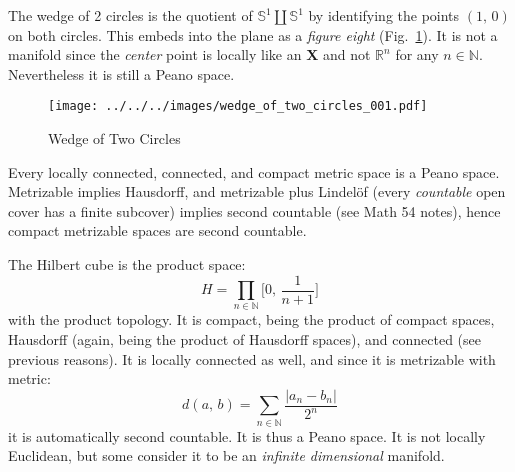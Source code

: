 \documentclass{article}
\theoremstyle{plain}
\theoremstyle{normal}
\newenvironment{example}{%
    \pushQED{\qed}\renewcommand{\qedsymbol}{$\blacksquare$}\examplex%
}{%
    \popQED\endexamplex%
}
\begin{document}
        \begin{example}
            The wedge of 2 circles is the quotient of
            $\mathbb{S}^{1}\coprod\mathbb{S}^{1}$ by identifying the points
            $(1,\,0)$ on both circles. This embeds into the plane as a
            \textit{figure eight} (Fig.~\ref{fig:wedge_of_two_circles_001}).
            It is not a manifold since the \textit{center} point is locally
            like an \textbf{X} and not $\mathbb{R}^{n}$ for any
            $n\in\mathbb{N}$. Nevertheless it is still a Peano space.
        \end{example}
        \begin{figure}
            \centering
            \texttt{[image: ../../../images/wedge\_of\_two\_circles\_001.pdf]}
            \caption{Wedge of Two Circles}
            \label{fig:wedge_of_two_circles_001}
        \end{figure}
        \begin{example}
            Every locally connected, connected, and compact metric space is a
            Peano space. Metrizable implies Hausdorff, and
            metrizable plus Lindel\"{o}f (every \textit{countable} open cover
            has a finite subcover) implies second countable (see Math 54 notes),
            hence compact metrizable spaces are second countable.
        \end{example}
        \begin{example}
            The Hilbert cube is the product space:
            \begin{equation}
                H=\prod_{n\in\mathbb{N}}\big[0,\,\frac{1}{n+1}\big]
            \end{equation}
            with the product topology. It is compact, being the product of
            compact spaces, Hausdorff (again, being the product of Hausdorff
            spaces), and connected (see previous reasons). It is locally
            connected as well, and since it is metrizable with metric:
            \begin{equation}
                d(a,\,b)=
                \sum_{n\in\mathbb{N}}\frac{|a_{n}-b_{n}|}{2^{n}}
            \end{equation}
            it is automatically second countable. It is thus a Peano
            space. It is not locally Euclidean, but some consider
            it to be an \textit{infinite dimensional} manifold.
        \end{example}
    \printindex
\end{document}
